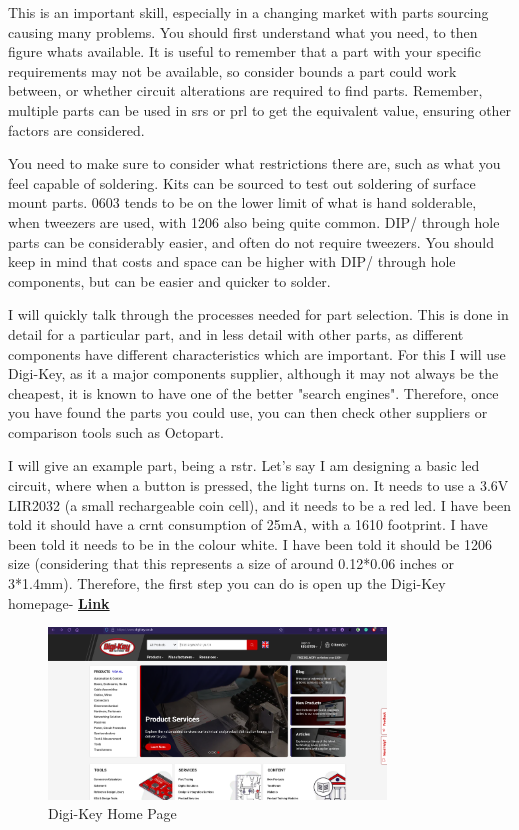 \documentclass[a4paper,11pt]{report}
\let\oldhref\href %
\renewcommand{\href}[2]{\oldhref{#1}{\bfseries#2}}
\begin{document}
This is an important skill, especially in a changing market with parts sourcing causing many problems. You should first understand what you need, to then figure whats available. It is useful to remember that a part with your specific requirements may not be available, so consider bounds a part could work between, or whether circuit alterations are required to find parts. Remember, multiple parts can be used in \gls{srs} or \gls{prl} to get the equivalent value, ensuring other factors are considered.

You need to make sure to consider what restrictions there are, such as what you feel capable of soldering. Kits can be sourced to test out soldering of surface mount parts. 0603 tends to be on the lower limit of what is hand solderable, when tweezers are used, with 1206 also being quite common. DIP/ through hole parts can be considerably easier, and often do not require tweezers. You should keep in mind that costs and space can be higher with DIP/ through hole components, but can be easier and quicker to solder.

I will quickly talk through the processes needed for part selection. This is done in detail for a particular part, and in less detail with other parts, as different components have different characteristics which are important. For this I will use Digi-Key, as it a major components supplier, although it may not always be the cheapest, it is known to have one of the better "search engines". Therefore, once you have found the parts you could use, you can then check other suppliers or comparison tools such as Octopart.

I will give an example part, being a \gls{rstr}. Let's say I am designing a basic \gls{led} circuit, where when a button is pressed, the light turns on. It needs to use a 3.6V LIR2032 (a small rechargeable coin cell), and it needs to be a red \gls{led}. I have been told it should have a \gls{crnt} consumption of 25mA, with a  1610 footprint. I have been told it needs to be in the colour white. I have been told it should be 1206 size (considering that this represents a size of around 0.12*0.06 inches or 3*1.4mm).
Therefore, the first step you can do is open up the Digi-Key homepage- \href{https://www.DigiKey.co.uk/}{Link}

\begin{figure}[H]
\centering
\includegraphics[width=0.8\textwidth]{screenshots/DigiKeyHome}
\caption{Digi-Key Home Page}
\end{figure}
\end{document}
